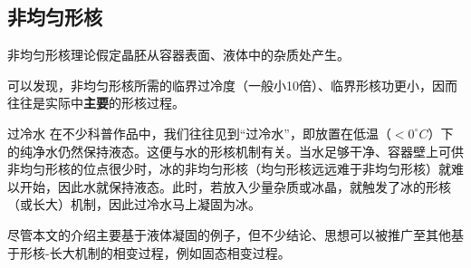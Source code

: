 \subsection{非均匀形核}
非均匀形核理论假定晶胚从容器表面、液体中的杂质处产生。

可以发现，非均匀形核所需的临界过冷度（一般小10倍）、临界形核功更小，因而往往是实际中\textbf{主要}的形核过程。

\begin{example}{过冷水}
在不少科普作品中，我们往往见到“过冷水”，即放置在低温（$<0 ^\circ C$）下的纯净水仍然保持液态。这便与水的形核机制有关。当水足够干净、容器壁上可供非均匀形核的位点很少时，冰的非均匀形核（均匀形核远远难于非均匀形核）就难以开始，因此水就保持液态。此时，若放入少量杂质或冰晶，就触发了冰的形核（或长大）机制，因此过冷水马上凝固为冰。
\end{example}

尽管本文的介绍主要基于液体凝固的例子，但不少结论、思想可以被推广至其他基于形核-长大机制的相变过程，例如固态相变过程。
